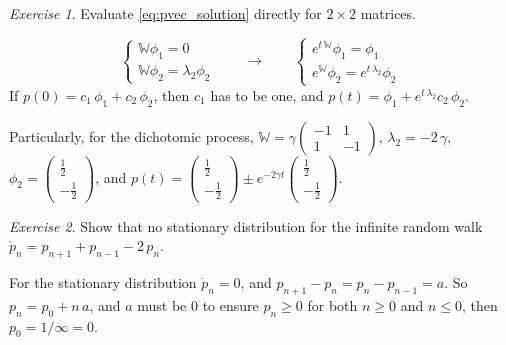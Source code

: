 \documentclass{book}
\numberwithin{equation}{section}
\theoremstyle{plain}
\theoremstyle{definition}
\theoremstyle{remark}
\theoremstyle{BoldStyle}
\newtheorem{exercise}{Exercise}
\numberwithin{exercise}{section}
\begin{document}
\begin{exercise}
  Evaluate \eqref{eq:pvec_solution}
  directly for $2 \times 2$ matrices.

  $$
    \left\{
      \begin{array}{llll}
        \mathbb W \phi_1 = 0 \\
        \mathbb W \phi_2 = \lambda_2 \phi_2
      \end{array}
    \right.
    \qquad
    \to
    \qquad
    \left\{
      \begin{array}{llll}
        e^{t \, \mathbb W} \phi_1 = \phi_1 \\
        e^{\mathbb W} \phi_2 = e^{t \, \lambda_2} \phi_2
      \end{array}
    \right.
  $$
  If $p(0) = c_1 \, \phi_1 + c_2 \, \phi_2$, then $c_1$ has to be one,
  and $p(t) = \phi_1 + e^{t \, \lambda_2} c_2 \, \phi_2$.

  Particularly, for the dichotomic process,
  $\mathbb W = \gamma \left(
    \begin{array}{llll}
        -1 & 1 \\
        1 & -1
    \end{array}\right)$,
  $\lambda_2 = -2 \, \gamma$,
  $\phi_2 = \left(
    \begin{array}{llll}
        \frac 1 2 \\
        -\frac 1 2
    \end{array}\right)$,
    and
    $p(t) =
    \left(\begin{array}{llll}
        \frac 1 2 \\
        -\frac 1 2
    \end{array}\right)
    \pm e^{-2\gamma t}
    \left(\begin{array}{llll}
        \frac 1 2 \\
        -\frac 1 2
    \end{array}\right)
    $.
\end{exercise}

\begin{exercise}
  Show that no stationary distribution for the infinite random walk
  $\dot p_n = p_{n+1} + p_{n-1} - 2 \, p_n$.

  For the stationary distribution $\dot p_n = 0$,
  and $p_{n+1} - p_{n} = p_n - p_{n-1} = a$.
  So $p_n = p_0 + n \, a$,
  and $a$ must be $0$ to ensure $p_n \ge 0 $
  for both $n \ge 0$ and $n \le 0$, then $p_0 = 1/\infty = 0$.
\end{exercise}
\end{document}
